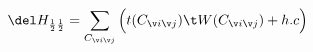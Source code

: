 \begin{equation}
 \del H_{\frac12\frac12} =\sum_{C_{\v i\v j}}
 \Big( t(C_{\v i\v j}) \t W(C_{\v i\v j}) +h.c \Big)
\end{equation}


